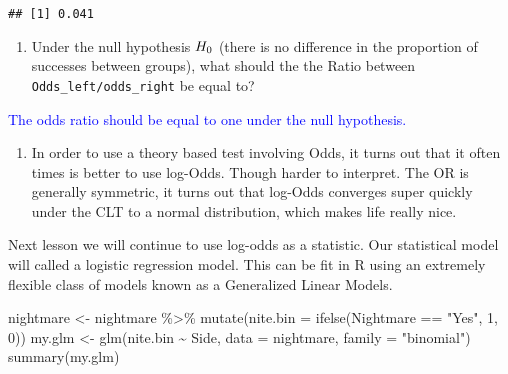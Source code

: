 \documentclass[
]{article}
\newenvironment{Shaded}{\begin{snugshade}}{\end{snugshade}}
\newcommand{\AttributeTok}[1]{\textcolor[rgb]{0.77,0.63,0.00}{#1}}
\newcommand{\DecValTok}[1]{\textcolor[rgb]{0.00,0.00,0.81}{#1}}
\newcommand{\FunctionTok}[1]{\textcolor[rgb]{0.00,0.00,0.00}{#1}}
\newcommand{\NormalTok}[1]{#1}
\newcommand{\OtherTok}[1]{\textcolor[rgb]{0.56,0.35,0.01}{#1}}
\newcommand{\SpecialCharTok}[1]{\textcolor[rgb]{0.00,0.00,0.00}{#1}}
\newcommand{\StringTok}[1]{\textcolor[rgb]{0.31,0.60,0.02}{#1}}
\providecommand{\tightlist}{%
  \setlength{\itemsep}{0pt}\setlength{\parskip}{0pt}}
\begin{document}
\begin{verbatim}
## [1] 0.041
\end{verbatim}

\vspace{0.25in}

\begin{enumerate}
\def\labelenumi{(\arabic{enumi})}
\setcounter{enumi}{18}
\tightlist
\item
  Under the null hypothesis \(\small H_0\) (there is no difference in
  the proportion of successes between groups), what should the the Ratio
  between \texttt{Odds\_left/odds\_right} be equal to?
\end{enumerate}

\textcolor{blue}{The odds ratio should be equal to one under the null hypothesis.}

\vspace{0.5in}

\begin{enumerate}
\def\labelenumi{(\arabic{enumi})}
\setcounter{enumi}{19}
\tightlist
\item
  In order to use a theory based test involving Odds, it turns out that
  it often times is better to use log-Odds. Though harder to interpret.
  The OR is generally symmetric, it turns out that log-Odds converges
  super quickly under the CLT to a normal distribution, which makes life
  really nice.
\end{enumerate}

Next lesson we will continue to use log-odds as a statistic. Our
statistical model will called a logistic regression model. This can be
fit in R using an extremely flexible class of models known as a
Generalized Linear Models.

\begin{Shaded}
\begin{Highlighting}[]
\NormalTok{nightmare }\OtherTok{\textless{}{-}}\NormalTok{ nightmare }\SpecialCharTok{\%\textgreater{}\%} \FunctionTok{mutate}\NormalTok{(}\AttributeTok{nite.bin =} \FunctionTok{ifelse}\NormalTok{(Nightmare }\SpecialCharTok{==} \StringTok{"Yes"}\NormalTok{, }\DecValTok{1}\NormalTok{, }\DecValTok{0}\NormalTok{))}
\NormalTok{my.glm }\OtherTok{\textless{}{-}} \FunctionTok{glm}\NormalTok{(nite.bin }\SpecialCharTok{\textasciitilde{}}\NormalTok{ Side, }\AttributeTok{data =}\NormalTok{ nightmare, }\AttributeTok{family =} \StringTok{"binomial"}\NormalTok{)}
\FunctionTok{summary}\NormalTok{(my.glm)}
\end{Highlighting}
\end{Shaded}
\end{document}
